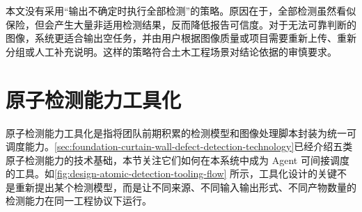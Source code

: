 本文没有采用“输出不确定时执行全部检测”的策略。原因在于，全部检测虽然看似保险，但会产生大量非适用检测结果，反而降低报告可信度。对于无法可靠判断的图像，系统更适合输出空任务，并由用户根据图像质量或项目需要重新上传、重新分组或人工补充说明。这样的策略符合土木工程场景对结论依据的审慎要求。

\section{原子检测能力工具化}
\label{sec:design-atomic-detection-capability-tooling}

原子检测能力工具化是指将团队前期积累的检测模型和图像处理脚本封装为统一可调度能力。\cref{sec:foundation-curtain-wall-defect-detection-technology}已经介绍五类原子检测能力的技术基础，本节关注它们如何在本系统中成为 Agent 可间接调度的工具。如\cref{fig:design-atomic-detection-tooling-flow} 所示，工具化设计的关键不是重新提出某个检测模型，而是让不同来源、不同输入输出形式、不同产物数量的检测能力在同一工程协议下运行。

